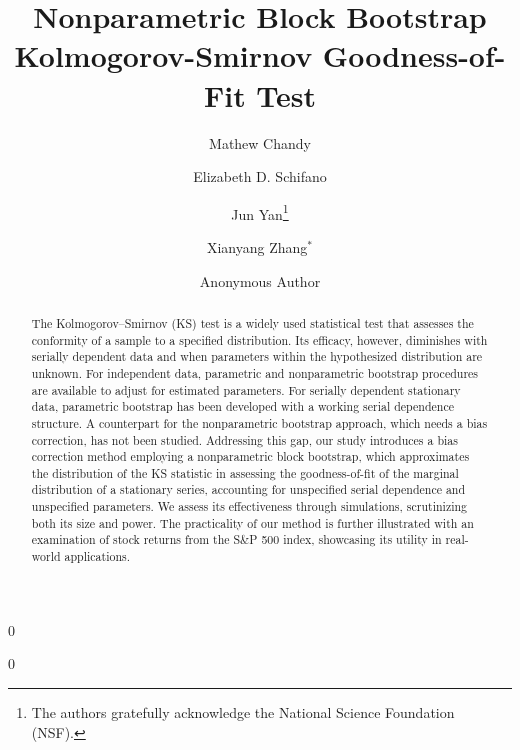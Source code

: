 \documentclass[12pt]{article}
\newcommand{\blind}{0}
\begin{document}
%

\def\spacingset#1{\renewcommand{\baselinestretch}%
{#1}\small\normalsize} \spacingset{1}



\title{\bf Nonparametric Block Bootstrap Kolmogorov-Smirnov Goodness-of-Fit Test}
\blind
{
  \author[1,2]{Mathew Chandy}
  \author[1]{Elizabeth D. Schifano}
  \author[1]{Jun Yan\thanks{
    The authors gratefully acknowledge the National Science Foundation (NSF).}\hspace{.2cm}}
  \author[3]{Xianyang Zhang$^{\ast}$ }
  \maketitle
} \fi

\blind
{
  \bigskip
  \bigskip
  \bigskip
  \author{Anonymous Author}
} \fi

\maketitle

\bigskip
\begin{abstract}
The Kolmogorov--Smirnov (KS) test is a widely used
statistical test that
assesses the conformity of a sample to a specified distribution. Its efficacy,
however, diminishes with serially dependent data and when parameters
within the hypothesized distribution are unknown. For independent data,
parametric and nonparametric bootstrap procedures are available to adjust for
estimated parameters. For serially dependent stationary data, parametric
bootstrap has been developed with a working serial dependence structure. A
counterpart for the nonparametric bootstrap approach, which needs a bias
correction, has not been studied. Addressing this gap, our study introduces a
bias correction method employing a nonparametric block bootstrap, which
approximates the distribution of the KS statistic in assessing the
goodness-of-fit of the marginal distribution of a stationary series,
accounting for unspecified
serial dependence and unspecified parameters. We assess its effectiveness
through simulations, scrutinizing both its size and power. The practicality of
our method is further illustrated with an examination of stock returns from the
S\&P 500 index, showcasing its utility in real-world
applications.
\end{abstract}
\end{document}
